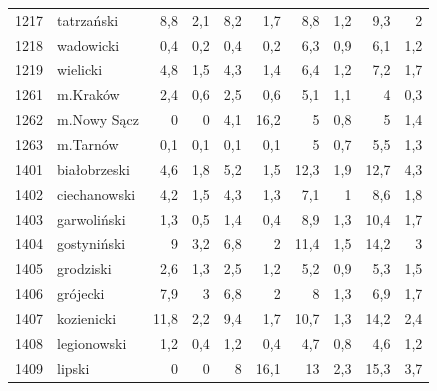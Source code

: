 \begin{center}
\begin{longtable}{lp{3cm}rrrrrrrr}
1217 & tatrzański              & 8,8     & 2,1         & 8,2      & 1,7          & 8,8      & 1,2          & 9,3      & 2            \\
1218 & wadowicki               & 0,4     & 0,2         & 0,4      & 0,2          & 6,3      & 0,9          & 6,1      & 1,2          \\
1219 & wielicki                & 4,8     & 1,5         & 4,3      & 1,4          & 6,4      & 1,2          & 7,2      & 1,7          \\
1261 & m.Kraków                & 2,4     & 0,6         & 2,5      & 0,6          & 5,1      & 1,1          & 4        & 0,3          \\
1262 & m.Nowy Sącz             & 0       & 0           & 4,1      & 16,2         & 5        & 0,8          & 5        & 1,4          \\
1263 & m.Tarnów                & 0,1     & 0,1         & 0,1      & 0,1          & 5        & 0,7          & 5,5      & 1,3          \\
1401 & białobrzeski            & 4,6     & 1,8         & 5,2      & 1,5          & 12,3     & 1,9          & 12,7     & 4,3          \\
1402 & ciechanowski            & 4,2     & 1,5         & 4,3      & 1,3          & 7,1      & 1            & 8,6      & 1,8          \\
1403 & garwoliński             & 1,3     & 0,5         & 1,4      & 0,4          & 8,9      & 1,3          & 10,4     & 1,7          \\
1404 & gostyniński             & 9       & 3,2         & 6,8      & 2            & 11,4     & 1,5          & 14,2     & 3            \\
1405 & grodziski               & 2,6     & 1,3         & 2,5      & 1,2          & 5,2      & 0,9          & 5,3      & 1,5          \\
1406 & grójecki                & 7,9     & 3           & 6,8      & 2            & 8        & 1,3          & 6,9      & 1,7          \\
1407 & kozienicki              & 11,8    & 2,2         & 9,4      & 1,7          & 10,7     & 1,3          & 14,2     & 2,4          \\
1408 & legionowski             & 1,2     & 0,4         & 1,2      & 0,4          & 4,7      & 0,8          & 4,6      & 1,2          \\
1409 & lipski                  & 0       & 0           & 8        & 16,1         & 13       & 2,3          & 15,3     & 3,7          \\

\end{longtable}
\end{center}
